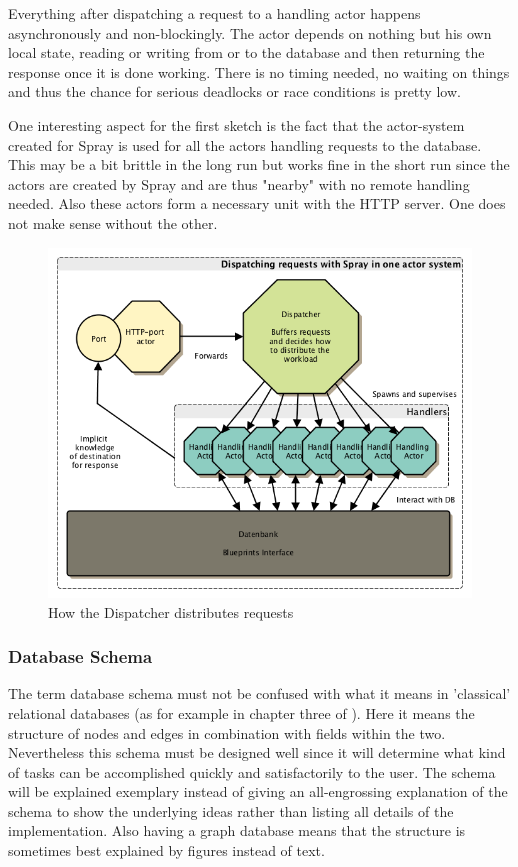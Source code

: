 \documentclass[twoside, 11pt]{scrartcl}
\begin{document}
Everything after dispatching a request to a handling actor happens asynchronously and non-blockingly. The actor depends on nothing but his own local state, reading or writing from or to the database and then returning the response once it is done working. There is no timing needed, no waiting on things and thus the chance for serious deadlocks or race conditions is pretty low.

One interesting aspect for the first sketch is the fact that the actor-system created for Spray is used for all the actors handling requests to the database. This may be a bit brittle in the long run but works fine in the short run since the actors are created by Spray and are thus "nearby" with no remote handling needed. Also these actors form a necessary unit with the HTTP server. One does not make sense without the other.

\begin{figure}[h!]		
 	\includegraphics[scale=0.6]{figures/sprayDispatcher.png}
	\caption{How the Dispatcher distributes requests}
	\label{fig:sprayDispatcher}
\end{figure}

\subsubsection{Database Schema}
The term database schema must not be confused with what it means in 'classical' relational databases (as for example in chapter three of \cite{fundamentalsDatabase}). Here it  means the structure of nodes and edges in combination with fields within the two. Nevertheless this schema must be designed well since it will determine what kind of tasks can be accomplished quickly and satisfactorily to the user. The schema will be explained exemplary instead of giving an all-engrossing explanation of the schema to show the underlying ideas rather than listing all details of the implementation. Also having a graph database means that the structure is sometimes best explained by figures instead of text.\\
\end{document}
